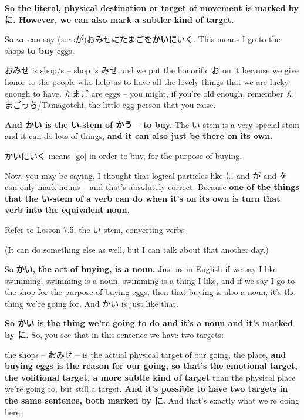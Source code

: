 {}

{\bf So the literal, physical destination or target of movement is marked by に. However, we can also mark a subtler kind of target.}

So we can say (zeroが)おみせにたまごを{\bf かいに}いく. This means I go to the shops {\bf to buy} eggs.

{}

おみせ is shop/s -- shop is みせ and we put the honorific お on it because we give honor to the people who help us to have all the lovely things that we are lucky enough to have. たまご are eggs -- you might, if you're old enough, remember たまごっち/Tamagotchi, the little egg-person that you raise.

{\bf And かい is the い-stem of かう -- to buy.} The い-stem is a very special stem and it can do lots of things, {\bf and it can also just be there on its own.}

{}

かいにいく means {[}go{]} in order to buy, for the purpose of buying.

\thinrule

Now, you may be saying, I thought that logical particles like に and が and を can only mark nouns -- and that's absolutely correct. Because {\bf one of the things that the い-stem of a verb can do when it's on its own is turn that verb into the equivalent noun.}

Refer to Lesson 7.5, the い-stem, converting verbs

(It can do something else as well, but I can talk about that another day.)

{}

So {\bf かい, the act of buying, is a noun.} Just as in English if we say I like swimming, swimming is a noun, swimming is a thing I like, and if we say I go to the shop for the purpose of buying eggs, then that buying is also a noun, it's the thing we're going for. And かい is just like that.

\thinrule

{\bf So かい is the thing we're going to do and it's a noun and it's marked by に.} So, you see that in this sentence we have two targets:

{}

the shops -- おみせ -- is the actual physical target of our going, the place, {\bf and buying eggs is the reason for our going, so that's the emotional target, the volitional target, a more subtle kind of target} than the physical place we're going to, but still a target. {\bf And it's possible to have two targets in the same sentence, both marked by に.} And that's exactly what we're doing here.

